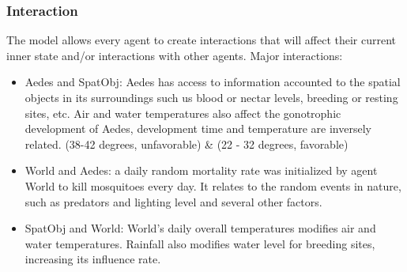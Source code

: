 \subsubsection{Interaction}

\indent The model allows every agent to create interactions that will affect their current inner state and/or interactions with other agents. Major interactions:
\begin{itemize}

	\item Aedes and SpatObj: Aedes has access to information accounted to the spatial objects in its surroundings such us blood or nectar levels, breeding or resting sites, etc. Air and water temperatures also affect the gonotrophic development of Aedes, development time and temperature are inversely related. (38-42 degrees, unfavorable) \& (22 - 32 degrees, favorable)
		
	\item World and Aedes: a daily random mortality rate was initialized by agent World to kill mosquitoes every day. It relates to the random events in nature, such as predators and lighting level and several other factors. 
		
	\item SpatObj and World: World's daily overall     temperatures modifies air and water temperatures. Rainfall also modifies water level for breeding sites, increasing its influence rate.
\end{itemize}


